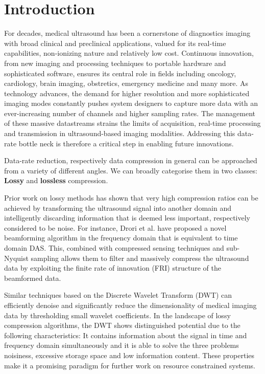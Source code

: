 \chapter{Introduction}
\label{ch:introduction}

For decades, medical ultrasound has been a cornerstone of diagnostics imaging with broad clinical and preclinical applications, valued for its real-time capabilities, non-ionizing nature and relatively low cost.\cite{CompressedDrori2021} Continuous innovation, from new imaging and processing techniques to portable hardware and sophisticated software, ensures its central role in fields including oncology, cardiology, brain imaging, obstretics\cite{DualNyayapathi2024}, emergency medicine and many more. As technology advances, the demand for higher resolution and more sophisticated imaging modes constantly pushes system designers to capture more data with an ever-increasing number of channels and higher sampling rates. The management of these massive datastreams strains the limits of acquisition, real-time processing and transmission in ultrasound-based imaging modalities. Addressing this data-rate bottle neck is therefore a critical step in enabling future innovations.

Data-rate reduction, respectively data compression in general can be approached from a variety of different angles. We can broadly categorise them in two classes: \textbf{Lossy} and \textbf{lossless} compression.

Prior work on lossy methods has shown that very high compression ratios can be achieved by transforming the ultrasound signal into another domain and intelligently discarding information that is deemed less important, respectively considered to be noise. For instance, Drori et al.\cite{CompressDrori2021} have proposed a novel beamforming algorithm in the frequency domain that is equivalent to time domain DAS. This, combined with compressed sensing techniques and sub-Nyquist sampling allows them to filter and massively compress the ultrasound data by exploiting the finite rate of innovation (FRI) structure of the beamformed data.

Similar techniques based on the Discrete Wavelet Transform (DWT) can efficiently denoise and significantly reduce the dimensionality of medical imaging data by thresholding small wavelet coefficients. In the landscape of lossy compression algorithms, the DWT shows distinguished potential due to the following characteristics: It contains information about the signal in time and frequency domain simultaneously and it is able to solve the three problems noisiness, excessive storage space and low information content.\cite{RNS-BasedNagornov2022} These properties make it a promising paradigm for further work on resource constrained systems.

